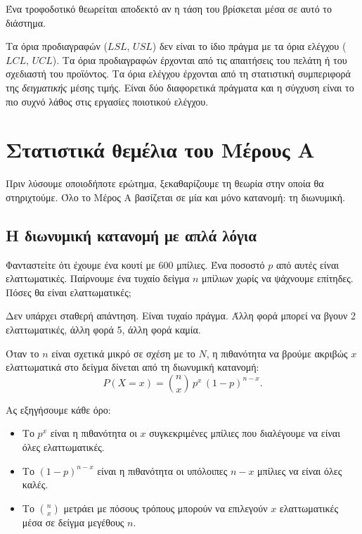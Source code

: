 \documentclass[12pt,a4paper]{article}
\begin{document}
Ένα τροφοδοτικό θεωρείται αποδεκτό αν η τάση του βρίσκεται μέσα σε αυτό το
διάστημα.

\begin{trap}
Τα όρια προδιαγραφών (\(LSL\), \(USL\)) δεν είναι το ίδιο πράγμα με τα όρια
ελέγχου (\(LCL\), \(UCL\)). Τα όρια προδιαγραφών έρχονται από τις απαιτήσεις
του πελάτη ή του σχεδιαστή του προϊόντος. Τα όρια ελέγχου έρχονται από τη
στατιστική συμπεριφορά της \emph{δειγματικής} μέσης τιμής. Είναι δύο
διαφορετικά πράγματα και η σύγχυση είναι το πιο συχνό λάθος στις εργασίες
ποιοτικού ελέγχου.
\end{trap}

\newpage

\section{Στατιστικά θεμέλια του Μέρους Α}

Πριν λύσουμε οποιοδήποτε ερώτημα, ξεκαθαρίζουμε τη θεωρία στην οποία θα
στηριχτούμε. Όλο το Μέρος Α βασίζεται σε μία και μόνο κατανομή: τη
διωνυμική.

\subsection{Η διωνυμική κατανομή με απλά λόγια}

Φανταστείτε ότι έχουμε ένα κουτί με 600 μπίλιες. Ένα ποσοστό \(p\) από αυτές
είναι ελαττωματικές. Παίρνουμε ένα τυχαίο δείγμα \(n\) μπίλιων χωρίς να
ψάχνουμε επίτηδες. Πόσες θα είναι ελαττωματικές;

Δεν υπάρχει σταθερή απάντηση. Είναι τυχαίο πράγμα. Άλλη φορά μπορεί να βγουν
2 ελαττωματικές, άλλη φορά 5, άλλη φορά καμία.

Όταν το \(n\) είναι σχετικά μικρό σε σχέση με το \(N\), η πιθανότητα να βρούμε
ακριβώς \(x\) ελαττωματικά στο δείγμα δίνεται από τη διωνυμική κατανομή:
\[
    P(X=x)
    =
    \binom{n}{x}\,p^{x}\,(1-p)^{n-x}.
\]

Ας εξηγήσουμε κάθε όρο:

\begin{itemize}[leftmargin=2.2em]
    \item Το \(p^{x}\) είναι η πιθανότητα οι \(x\) συγκεκριμένες μπίλιες που
    διαλέγουμε να είναι όλες ελαττωματικές.
    \item Το \((1-p)^{n-x}\) είναι η πιθανότητα οι υπόλοιπες \(n-x\) μπίλιες
    να είναι όλες καλές.
    \item Το \(\binom{n}{x}\) μετράει με πόσους τρόπους μπορούν να επιλεγούν
    \(x\) ελαττωματικές μέσα σε δείγμα μεγέθους \(n\).
\end{itemize}
\end{document}
